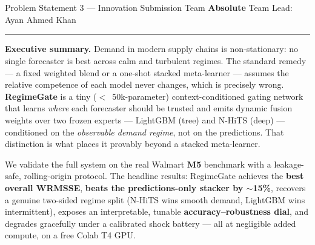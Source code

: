 \documentclass[11pt,a4paper]{article}
\begin{document}
\thispagestyle{fancy}
\begingroup
\color{ink}
{\noindent\colorbox{ink}{\parbox[c][2.9cm][c]{\dimexpr\textwidth-2\fboxsep}{%
  \color{white}\sffamily
  \\[4pt]
  \hspace{0.32cm}{\large An Adaptive Fusion Controller for Non-Stationary Demand}\\[6pt]
  \hspace{0.32cm}{\footnotesize\itshape Detailed Solution \& Prototype Document \quad\textbullet\quad Round 2}%
}}}
\endgroup

\vspace{8pt}
{\small\sffamily Problem Statement 3 --- Innovation Submission \quad\textbullet\quad
Team \textbf{Absolute} \quad\textbullet\quad Team Lead: Ayan Ahmed Khan}

\vspace{4pt}
{\color{ink}\rule{\textwidth}{1pt}}
\vspace{6pt}

\noindent\textbf{Executive summary.} Demand in modern supply chains is non-stationary: no single
forecaster is best across calm and turbulent regimes. The standard remedy --- a fixed weighted
blend or a one-shot stacked meta-learner --- assumes the relative competence of each model never
changes, which is precisely wrong. \textbf{RegimeGate} is a tiny ($<$~50k-parameter)
context-conditioned gating network that learns \emph{where} each forecaster should be trusted and
emits dynamic fusion weights over two frozen experts --- LightGBM (tree) and N-HiTS (deep) ---
conditioned on the \emph{observable demand regime}, not on the predictions. That distinction is what
places it provably beyond a stacked meta-learner.

We validate the full system on the real Walmart \textbf{M5} benchmark with a leakage-safe,
rolling-origin protocol. The headline results: RegimeGate achieves the \textbf{best overall WRMSSE},
\textbf{beats the predictions-only stacker by $\sim$15\%}, recovers a genuine two-sided regime split
(N-HiTS wins smooth demand, LightGBM wins intermittent), exposes an interpretable, tunable
\textbf{accuracy--robustness dial}, and degrades gracefully under a calibrated shock battery --- all
at negligible added compute, on a free Colab T4 GPU.
\end{document}
